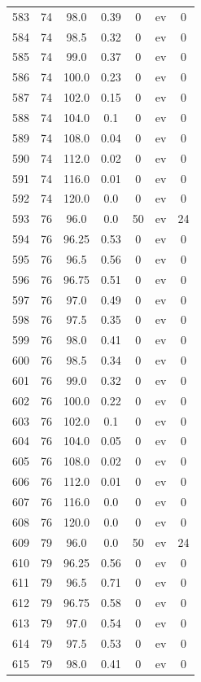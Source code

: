 \documentclass[12pt,a4paper]{article}
\begin{document}
\begin{tabular}{r|cccccc}
	583 & 74 & 98.0 & 0.39 & 0 & ev & 0 \\
	584 & 74 & 98.5 & 0.32 & 0 & ev & 0 \\
	585 & 74 & 99.0 & 0.37 & 0 & ev & 0 \\
	586 & 74 & 100.0 & 0.23 & 0 & ev & 0 \\
	587 & 74 & 102.0 & 0.15 & 0 & ev & 0 \\
	588 & 74 & 104.0 & 0.1 & 0 & ev & 0 \\
	589 & 74 & 108.0 & 0.04 & 0 & ev & 0 \\
	590 & 74 & 112.0 & 0.02 & 0 & ev & 0 \\
	591 & 74 & 116.0 & 0.01 & 0 & ev & 0 \\
	592 & 74 & 120.0 & 0.0 & 0 & ev & 0 \\
	593 & 76 & 96.0 & 0.0 & 50 & ev & 24 \\
	594 & 76 & 96.25 & 0.53 & 0 & ev & 0 \\
	595 & 76 & 96.5 & 0.56 & 0 & ev & 0 \\
	596 & 76 & 96.75 & 0.51 & 0 & ev & 0 \\
	597 & 76 & 97.0 & 0.49 & 0 & ev & 0 \\
	598 & 76 & 97.5 & 0.35 & 0 & ev & 0 \\
	599 & 76 & 98.0 & 0.41 & 0 & ev & 0 \\
	600 & 76 & 98.5 & 0.34 & 0 & ev & 0 \\
	601 & 76 & 99.0 & 0.32 & 0 & ev & 0 \\
	602 & 76 & 100.0 & 0.22 & 0 & ev & 0 \\
	603 & 76 & 102.0 & 0.1 & 0 & ev & 0 \\
	604 & 76 & 104.0 & 0.05 & 0 & ev & 0 \\
	605 & 76 & 108.0 & 0.02 & 0 & ev & 0 \\
	606 & 76 & 112.0 & 0.01 & 0 & ev & 0 \\
	607 & 76 & 116.0 & 0.0 & 0 & ev & 0 \\
	608 & 76 & 120.0 & 0.0 & 0 & ev & 0 \\
	609 & 79 & 96.0 & 0.0 & 50 & ev & 24 \\
	610 & 79 & 96.25 & 0.56 & 0 & ev & 0 \\
	611 & 79 & 96.5 & 0.71 & 0 & ev & 0 \\
	612 & 79 & 96.75 & 0.58 & 0 & ev & 0 \\
	613 & 79 & 97.0 & 0.54 & 0 & ev & 0 \\
	614 & 79 & 97.5 & 0.53 & 0 & ev & 0 \\
	615 & 79 & 98.0 & 0.41 & 0 & ev & 0 \\

\end{tabular}
\end{document}
